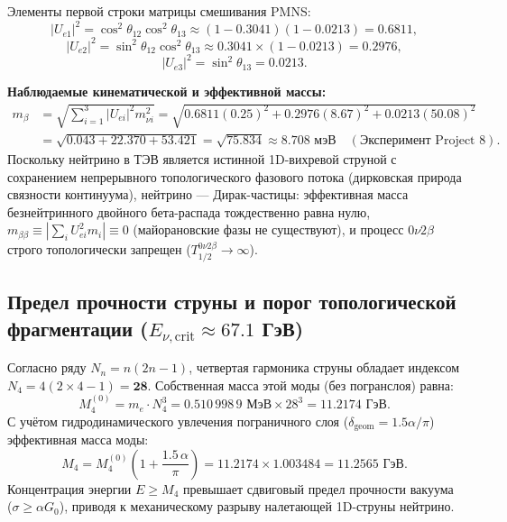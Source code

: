\documentclass[11pt,a4paper]{article}
\theoremstyle{definition}
\theoremstyle{remark}
\begin{document}
Элементы первой строки матрицы смешивания PMNS:
\begin{equation}
	|U_{e1}|^2 = \cos^2\theta_{12} \cos^2\theta_{13} \approx (1 - 0.3041)(1 - 0.0213) = \mathbf{0.6811},
\end{equation}
\begin{equation}
	|U_{e2}|^2 = \sin^2\theta_{12} \cos^2\theta_{13} \approx 0.3041 \times (1 - 0.0213) = \mathbf{0.2976},
\end{equation}
\begin{equation}
	|U_{e3}|^2 = \sin^2\theta_{13} = \mathbf{0.0213}.
\end{equation}

\textbf{Наблюдаемые кинематической и эффективной массы:}
\begin{align}
	m_\beta &= \sqrt{\sum_{i=1}^3 |U_{ei}|^2 m_{\nu i}^2} = \sqrt{0.6811 (0.25)^2 + 0.2976 (8.67)^2 + 0.0213 (50.08)^2} \nonumber \\
	&= \sqrt{0.043 + 22.370 + 53.421} = \sqrt{75.834} \approx \mathbf{8.708 \text{ мэВ}} \quad (\text{Эксперимент Project 8}).
\end{align}
Поскольку нейтрино в ТЭВ является истинной 1D-вихревой струной с сохранением непрерывного топологического фазового потока (дирковская природа связности континуума), нейтрино — Дирак-частицы: эффективная масса безнейтринного двойного бета-распада тождественно равна нулю, $m_{\beta\beta} \equiv \left|\sum_i U_{ei}^2 m_i\right| \equiv 0$ (майорановские фазы не существуют), и процесс $0\nu 2\beta$ строго топологически запрещен ($T_{1/2}^{0\nu 2\beta} \to \infty$).

\subsection{Предел прочности струны и порог топологической фрагментации ($E_{\nu, \text{crit}} \approx 67.1$ ГэВ)}
Согласно ряду $N_n = n(2n-1)$, четвертая гармоника струны обладает индексом $N_4 = 4(2 \times 4 - 1) = \mathbf{28}$. Собственная масса этой моды (без погранслоя) равна:
\begin{equation}
	M_4^{(0)} = m_e \cdot N_4^3 = 0.510\,998\,9 \text{ МэВ} \times 28^3 = \mathbf{11.2174 \text{ ГэВ}}.
\end{equation}
С учётом гидродинамического увлечения пограничного слоя ($\delta_{\mathrm{geom}} = 1.5\alpha/\pi$) эффективная масса моды:
\begin{equation}
	M_4 = M_4^{(0)}\left(1 + \frac{1.5\,\alpha}{\pi}\right) = 11.2174 \times 1.003484 = \mathbf{11.2565 \text{ ГэВ}}.
\end{equation}
Концентрация энергии $E \ge M_4$ превышает сдвиговый предел прочности вакуума ($\sigma \ge \alpha G_0$), приводя к механическому разрыву налетающей 1D-струны нейтрино. 
\end{document}
